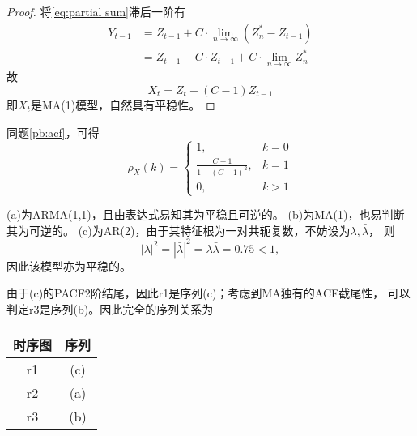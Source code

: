 \documentclass[cn]{homework}
\begin{document}
\begin{subproblem}[(\alph*)]
        \item
        \begin{proof}
            将\cref{eq:partial sum}滞后一阶有
            \[\begin{aligned}
                Y_{t-1}&=Z_{t-1}+C\cdot\lim_{n\to\infty}(Z^*_n-Z_{t-1})\\
                    &=Z_{t-1}-C\cdot Z_{t-1}+C\cdot\lim_{n\to\infty}Z^*_n
            \end{aligned}\]
            故
            \[X_t=Z_t+(C-1)Z_{t-1}\]
            即$X_t$是MA(1)模型，自然具有平稳性。
        \end{proof}

        \item
        同题\ref{pb:acf}，可得
        \[\rho_X(k)=\begin{cases}
            1,&k=0\\
            \frac{C-1}{1+(C-1)^2},&k=1\\
            0,&k>1
        \end{cases}\]
    \end{subproblem}

    \problem
    (a)为ARMA(1,1)，且由表达式易知其为平稳且可逆的。
    (b)为MA(1)，也易判断其为可逆的。
    (c)为AR(2)，由于其特征根为一对共轭复数，不妨设为$\lambda,\bar\lambda$，
    则
    \[|\lambda|^2=|\bar\lambda|^2=\lambda\bar\lambda=0.75<1,\]
    因此该模型亦为平稳的。

    由于(c)的PACF2阶结尾，因此r1是序列(c)；考虑到MA独有的ACF截尾性，
    可以判定r3是序列(b)。因此完全的序列关系为
    \begin{table}
        \centering
        \begin{tabular}{cc}
            \toprule
            时序图 & 序列 \\
            \midrule
            r1 & (c) \\
            r2 & (a) \\
            r3 & (b) \\
            \bottomrule
        \end{tabular}
    \end{table}
\end{document}
